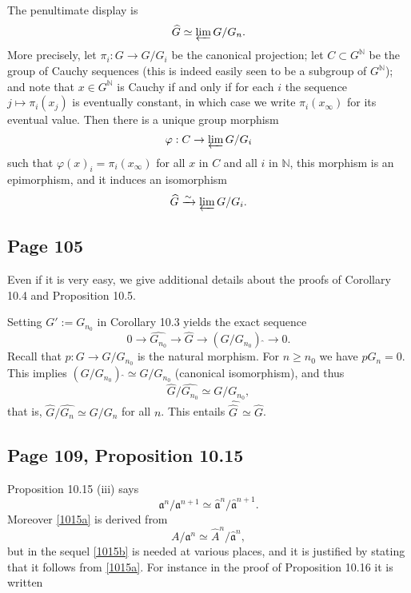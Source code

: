 \documentclass[parskip=half,fontsize=12pt]{scrartcl}%
\newcommand{\mf}{\mathfrak}
\begin{document}
The penultimate display is 
$$
\widehat G\simeq\varprojlim G/G_n.
$$ 
More precisely, let $\pi_i:G\to G/G_i$ be the canonical projection; let $C\subset G^{\mathbb N}$ be the group of Cauchy sequences (this is indeed easily seen to be a subgroup of $G^{\mathbb N}$); and note that $x\in G^{\mathbb N}$ is Cauchy if and only if for each $i$ the sequence $j\mapsto\pi_i(x_j)$ is eventually constant, in which case we write $\pi_i(x_\infty)$ for its eventual value. Then there is a unique group morphism 
$$
\varphi:C\to\varprojlim G/G_i
$$ 
such that $\varphi(x)_i=\pi_i(x_\infty)$ for all $x$ in $C$ and all $i$ in $\mathbb N$, this morphism is an epimorphism, and it induces an isomorphism 
$$
\widehat G\xrightarrow\sim\varprojlim G/G_i.
$$ %

\subsection{Page 105}%

Even if it is very easy, we give additional details about the proofs of Corollary 10.4 and Proposition 10.5. 

Setting $G':=G_{n_0}$ in Corollary 10.3 yields the exact sequence
$$
0\to\widehat{G_{n_0}}\to\widehat G\to(G/G_{n_0})\ \widehat{}\to0.
$$ 
Recall that $p:G\to G/G_{n_0}$ is the natural morphism. For $n\ge n_0$ we have $pG_n=0$. This implies $(G/G_{n_0})\ \widehat{}\simeq G/G_{n_0}$ (canonical isomorphism), and thus 
$$
\widehat G/\widehat{G_{n_0}}\simeq G/G_{n_0},
$$ 
that is, $\widehat G/\widehat{G_n}\simeq G/G_n$ for all $n$. This entails $\widehat{\widehat G\,}\simeq\widehat G$.

\subsection{Page 109, Proposition 10.15}%

Proposition 10.15 (iii) says 
\begin{equation}\label{1015a}
\mf a^n/\mf a^{n+1}\simeq\hat{\mf a}^n/\hat{\mf a}^{n+1}.
\end{equation}
Moreover \eqref{1015a} is derived from 
\begin{equation}\label{1015b}
A/\mf a^n\simeq\hat A^n/\hat{\mf a}^n,
\end{equation} 
but in the sequel \eqref{1015b} is needed at various places, and it is justified by stating that it follows from \eqref{1015a}. For instance in the proof of Proposition 10.16 it is written
\end{document}
